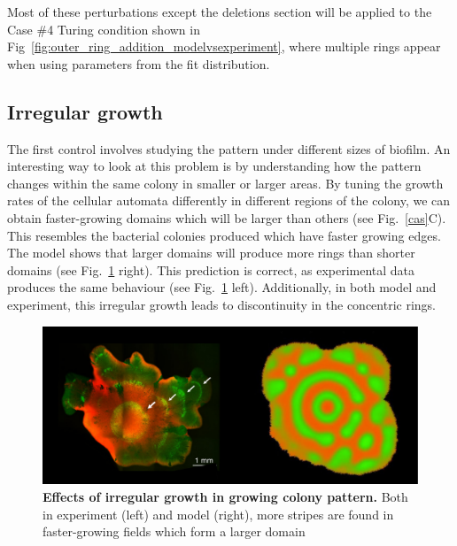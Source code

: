 Most of these perturbations except the deletions section will be applied to the Case \#4 Turing condition shown in Fig~\ref{fig:outer_ring_addition_modelvsexperiment}, where multiple rings appear when using parameters from the fit distribution.

\subsection{Irregular growth}
The first control involves studying the pattern under different sizes of biofilm.
An interesting way to look at this problem is by understanding how the pattern changes within the same colony in smaller or larger areas.
By tuning the growth rates of the cellular automata differently in different regions of the colony, we can obtain faster-growing domains which will be larger than others (see Fig.~\ref{cas}C).
This resembles the bacterial colonies produced which have faster growing edges.
The model shows that larger domains will produce more rings than shorter domains (see Fig.~\ref{fig:irregular growth} right).
This prediction is correct, as experimental data produces the same behaviour  (see Fig.~\ref{fig:irregular growth} left).
Additionally, in both model and experiment, this irregular growth leads to discontinuity in the concentric rings.
\begin{figure}[H] %
    \centering
    \begin{adjustbox}{center}
        \includegraphics[width=1\textwidth]{chapters/Chapter 3/irregular growth} %
    \end{adjustbox}
    \caption{\textbf{Effects of irregular growth in growing colony pattern.} Both in experiment (left) and model (right), more stripes are found in faster-growing fields which form a larger domain}
    \label{fig:irregular growth}
\end{figure}


